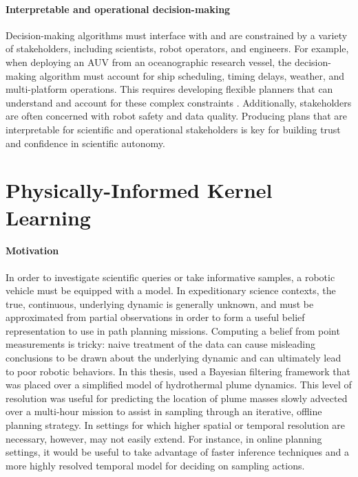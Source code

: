 \paragraph{Interpretable and operational decision-making}
Decision-making algorithms must interface with and are constrained by a variety of stakeholders, including scientists, robot operators, and engineers. For example, when deploying an AUV from an oceanographic research vessel, the decision-making algorithm must account for ship scheduling, timing delays, weather, and multi-platform operations. This requires developing flexible planners that can understand and account for these complex constraints \autocite{timmons2019automated}. Additionally, stakeholders are often concerned with robot safety and data quality. Producing plans that are interpretable for scientific and operational stakeholders is key for building trust and confidence in scientific autonomy. 



\section{Physically-Informed Kernel Learning}

\paragraph{Motivation}
In order to investigate scientific queries or take informative samples, a robotic vehicle must be equipped with a model.
In expeditionary science contexts, the true, continuous, underlying dynamic is generally unknown, and must be approximated from partial observations in order to form a useful belief representation to use in path planning missions.
Computing a belief from point measurements is tricky: naive treatment of the data can cause misleading conclusions to be drawn about the underlying dynamic and can ultimately lead to poor robotic behaviors.
In this thesis, \PHUMES used a Bayesian filtering framework that was placed over a simplified model of hydrothermal plume dynamics. This level of resolution was useful for predicting the location of plume masses slowly advected over a multi-hour mission to assist in sampling through an iterative, offline planning strategy.
In settings for which higher spatial or temporal resolution are necessary, however, \PHUMES may not easily extend.
For instance, in online planning settings, it would be useful to take advantage of faster inference techniques and a more highly resolved temporal model for deciding on sampling actions.

